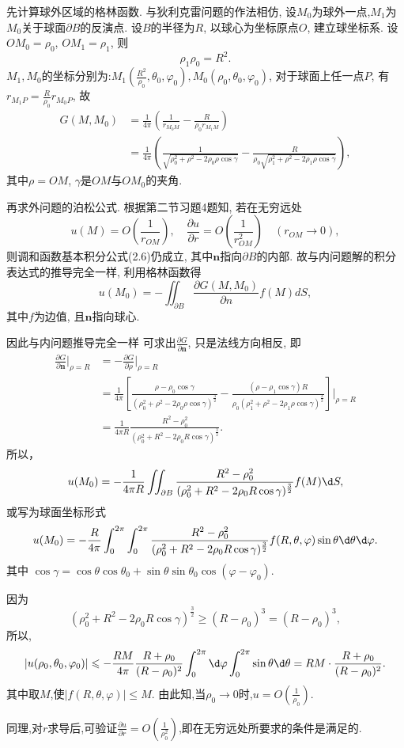 \begin{solve}
	先计算球外区域的格林函数. 与狄利克雷问题的作法相仿, 设$M_0$为球外一点,$M_1$为$M_0$关于球面$\partial B$的反演点. 设$B$的半径为$R$, 以球心为坐标原点$O$, 建立球坐标系. 设$OM_0=\rho _0$, $OM_1=\rho _1$, 则
	\[\rho_1\rho_0=R^2.\]
	$M_1,M_0$的坐标分别为:$\displaystyle M_1\left(\frac{R^2}{\rho_0},\theta_0,\varphi_0\right),M_0(\rho_0,\theta_0,\varphi_0)$, 对于球面上任一点$P$, 有 $\displaystyle r_{M_1P}=\frac R{\rho_{0}}r_{M_{0}P}$, 故
	$$\begin{aligned}
		G(M,M_{0})&=\frac{1}{4\pi}\left(\frac{1}{r_{M_{0}M}}-\frac{R}{\rho_0 r_{M_{1}M}}\right)\\
		&=\frac1{4\pi}\left(\frac1{\sqrt{\rho_0^2+\rho^2-2\rho_0\rho\cos\gamma}}-\frac R{\rho_0\sqrt{\rho_1^2+\rho^2-2\rho_1\rho\cos\gamma}}\right),
	\end{aligned}$$
	其中$\rho=OM$, $\gamma$是$OM$与$OM_{0}$的夹角.
	
	再求外问题的泊松公式. 根据第二节习题4题知, 若在无穷远处
	\[u(M)=O\left(\frac{1}{r_{OM}}\right),\quad\frac{\partial u}{\partial r}=O\left(\frac{1}{r_{OM}^{2}}\right)\quad (r_{OM}\to0),\]
	则调和函数基本积分公式(2.6)仍成立, 其中$\bm{n}$指向$\partial B$的内部. 故与内问题解的积分表达式的推导完全一样, 利用格林函数得
	\[u(M_0)=-\iint_{\partial B}\frac{\partial G(M,M_0)}{\partial n}f(M)dS,\]
	其中$f$为边值, 且$\bm{n}$指向球心.
	
	因此与内问题推导完全一样 可求出$\displaystyle\frac{\partial G}{\partial \bm{n}}$, 只是法线方向相反, 即
	$$\begin{aligned}
		\frac{\partial G}{\partial \bm{n}}\bigg|_{\rho=R}
		&=-\frac{\partial G}{\partial\rho}\bigg|_{\rho=R}\\
		&=\frac{1}{4\pi}\left[\frac{\rho-\rho_{0}\cos\gamma}{(\rho_{0}^{2}+\rho^{2}-2\rho_{0}\rho\cos\gamma)^{\frac{3}{2}}}-\frac{(\rho-\rho_{1}\cos\gamma)R}{\rho_{0}(\rho_{1}^{2}+\rho^{2}-2\rho_{1}\rho\cos\gamma)^{\frac{3}{2}}}\right]\bigg|_{\rho=R}\\
		&=\frac{1}{4\pi R}\frac{R^2-\rho_0^2}{(\rho_0^2+R^2-2\rho_0R\cos\gamma)^{\frac{3}{2}}}.
	\end{aligned}$$
	所以，
	$$u(M_0)=-\frac{1}{4\pi R}\iint_{\partial B}\frac{R^2-\rho_0^2}{(\rho_0^2+R^2-2\rho_0R\cos\gamma)^{\frac{3}{2}}}f(M)\d S,$$
	或写为球面坐标形式
	$$u(M_{0})=-\frac{R}{4\pi}\int_{0}^{2\pi}\int_{0}^{2\pi}\frac{R^{2}-\rho_{0}^{2}}{(\rho_{0}^{2}+R^{2}-2\rho_{0}R\cos\gamma)^{\frac{3}{2}}}f(R,\theta,\varphi)\sin\theta \d\theta\d\varphi.$$
	其中 $\cos\gamma=\cos\theta\cos\theta_0+\sin\theta\sin\theta_0\cos(\varphi-\varphi_0)$.
	
	因为
	$$(\rho_0^2+R^2-2\rho_0R\cos\gamma)^{\frac{3}{2}}\geq(R-\rho_0)^3=(R-\rho_0)^3,$$
	所以,
	$$|u(\rho_{0},\theta_{0},\varphi_{0})|\leq-\frac{RM}{4\pi}\frac{R+\rho_{0}}{(R-\rho_{0})^{2}}\int_{0}^{2\pi}\d\varphi\int_{0}^{2\pi}\sin\theta\d\theta=RM\cdot\frac{R+\rho_{0}}{(R-\rho_0)^2}.$$
	其中取$M$,使$\left|f(R,\theta,\varphi)\right|\leq M$. 由此知,当$\rho_0\to0$时,$\displaystyle u=O\left(\frac1{\rho_0}\right)$.
	
	同理,对$r$求导后,可验证$\displaystyle\frac{\partial u}{\partial r}=O\left(\frac1{\rho_0^2}\right)$,即在无穷远处所要求的条件是满足的.
\end{solve}


